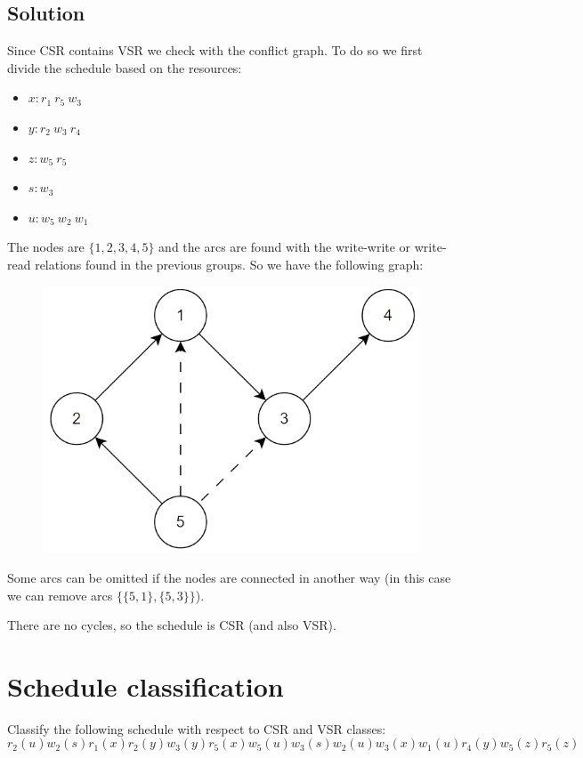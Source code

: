 \documentclass[12pt, a4paper]{report}
\newtheorem[style=M,bodystyle=\normalfont]{theorem}{Theorem}
\newtheorem[style=M,bodystyle=\normalfont]{corollary}{Corollary}
\newtheorem[style=M,bodystyle=\normalfont]{lemma}{Lemma}
\newtheorem[style=M,bodystyle=\normalfont]{definition}{Definition}
\begin{document}
    \subsection*{Solution}
        Since CSR contains VSR we check with the conflict graph. To do so we first divide the schedule based on the resources: 
        \begin{itemize}
            \item $x: r_1 \: r_5 \:w_3$
            \item $y: r_2 \: w_3 \:r_4$
            \item $z: w_5 \: r_5$
            \item $s: w_3$
            \item $u: w_5 \: w_2 \:w_1$
        \end{itemize}
        The nodes are $\{1,2,3,4,5\}$ and the arcs are found with the write-write or write-read relations found in the previous groups. 
        So we have the following graph:
        \begin{figure}[H]
            \centering
            \includegraphics[width=0.5\linewidth]{images/conflictgraph.png}
        \end{figure}
        Some arcs can be omitted if the nodes are connected in another way (in this case we can remove arcs $\{\{5,1\},\{5,3\}\}$). 

        There are no cycles, so the schedule is CSR (and also VSR). 

    \newpage
    
    \section{Schedule classification}
        Classify the following schedule with respect to CSR and VSR classes:  
        \[r_2(u) w_2(s) r_1(x) r_2(y) w_3(y) r_5(x) w_5(u) w_3(s)w_2(u) w_3(x) w_1(u) r_4(y) w_5(z) r_5(z)\]
\end{document}
